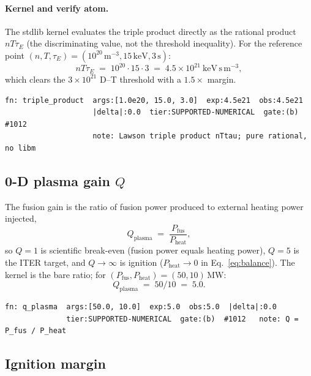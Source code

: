\paragraph{Kernel and verify atom.}
The stdlib kernel evaluates the triple product directly as the rational
product $nT\tau_{\!E}$ (the discriminating value, not the threshold
inequality). For the reference point $(n,T,\tau_{\!E})=(10^{20}\,\text{m}^{-3},
15\,\text{keV},3\,\text{s})$:
\begin{equation}
nT\tau_{\!E} \;=\; 10^{20}\cdot 15\cdot 3 \;=\; 4.5\times10^{21}\ \text{keV}\,\text{s}\,\text{m}^{-3},
\end{equation}
which clears the $3\times10^{21}$ D--T threshold with a $1.5\times$ margin.
\begin{lstlisting}
fn: triple_product  args:[1.0e20, 15.0, 3.0]  exp:4.5e21  obs:4.5e21
                    |delta|:0.0  tier:SUPPORTED-NUMERICAL  gate:(b)  #1012
                    note: Lawson triple product nTtau; pure rational, no libm
\end{lstlisting}

\subsection{0-D plasma gain $Q$}
\label{app:lawson-q}

The fusion gain is the ratio of fusion power produced to external heating
power injected,
\begin{equation}
Q_{\text{plasma}} \;=\; \frac{P_{\text{fus}}}{P_{\text{heat}}},
\label{eq:q}
\end{equation}
so $Q=1$ is scientific break-even (fusion power equals heating power),
$Q=5$ is the ITER target, and $Q\to\infty$ is ignition
($P_{\text{heat}}\to0$ in Eq.~\ref{eq:balance}). The kernel is the bare
ratio; for $(P_{\text{fus}},P_{\text{heat}})=(50,10)$\,MW:
\begin{equation}
Q_{\text{plasma}} \;=\; 50/10 \;=\; 5.0.
\end{equation}
\begin{lstlisting}
fn: q_plasma  args:[50.0, 10.0]  exp:5.0  obs:5.0  |delta|:0.0
              tier:SUPPORTED-NUMERICAL  gate:(b)  #1012   note: Q = P_fus / P_heat
\end{lstlisting}

\subsection{Ignition margin}
\label{app:lawson-margin}

